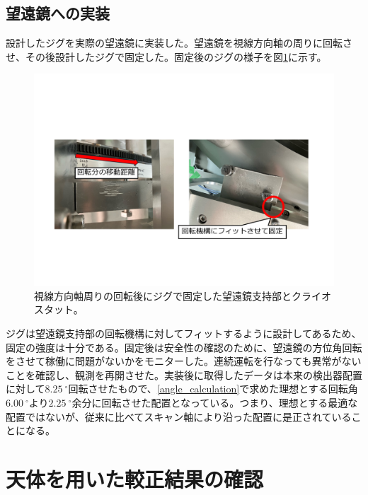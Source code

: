\subsection{望遠鏡への実装}
設計したジグを実際の望遠鏡に実装した。望遠鏡を視線方向軸の周りに回転させ、その後設計したジグで固定した。固定後のジグの様子を図\ref{jig_install}に示す。
\begin{figure}[htbp]
  \centering
  \includegraphics[width=0.85\columnwidth]{5_alignment/figs/jig_install.pdf}
  \caption{視線方向軸周りの回転後にジグで固定した望遠鏡支持部とクライオスタット。}
  \label{jig_install}
\end{figure}
ジグは望遠鏡支持部の回転機構に対してフィットするように設計してあるため、固定の強度は十分である。固定後は安全性の確認のために、望遠鏡の方位角回転をさせて稼働に問題がないかをモニターした。連続運転を行なっても異常がないことを確認し、観測を再開させた。実装後に取得したデータは本来の検出器配置に対して$\SI{8.25}{^{\circ}}$回転させたもので、\ref{angle_calculation}で求めた理想とする回転角$\SI{6.00}{^{\circ}}$より$\SI{2.25}{^{\circ}}$余分に回転させた配置となっている。つまり、理想とする最適な配置ではないが、従来に比べてスキャン軸により沿った配置に是正されていることになる。

\section{天体を用いた較正結果の確認}

